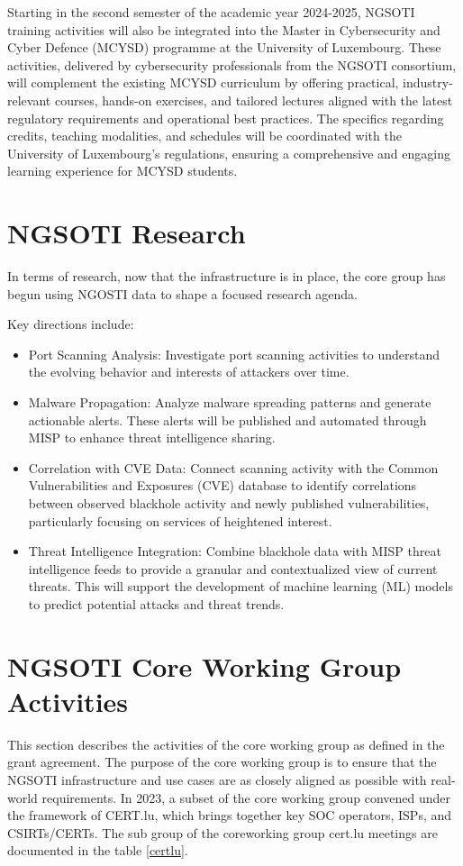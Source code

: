 Starting in the second semester of the academic year 2024-2025, NGSOTI
training activities will also be integrated into the Master in
Cybersecurity and Cyber Defence (MCYSD) programme at the University of
Luxembourg. These activities, delivered by cybersecurity professionals
from the NGSOTI consortium, will complement the existing MCYSD
curriculum by offering practical, industry-relevant courses, hands-on
exercises, and tailored lectures aligned with the latest regulatory
requirements and operational best practices. The specifics regarding
credits, teaching modalities, and schedules will be coordinated with the
University of Luxembourg's regulations, ensuring a comprehensive and
engaging learning experience for MCYSD students.

\section{NGSOTI Research}
In terms of research, now that the infrastructure is in place, the core group
has begun using NGOSTI data to shape a focused research agenda.

Key directions include:

\begin{itemize}
 \item Port Scanning Analysis: Investigate port scanning activities to
 understand the evolving behavior and interests of attackers over time.
 \item Malware Propagation: Analyze malware spreading patterns and
 generate actionable alerts. These alerts will be published and automated
 through MISP to enhance threat intelligence sharing.
 \item Correlation with CVE Data: Connect scanning activity with the
 Common Vulnerabilities and Exposures (CVE) database to identify
 correlations between observed blackhole activity and newly published
 vulnerabilities, particularly focusing on services of heightened interest.
 \item Threat Intelligence Integration: Combine blackhole data with MISP
 threat intelligence feeds to provide a granular and contextualized view
 of current threats. This will support the development of machine
 learning (ML) models to predict potential attacks and threat trends.
 \end{itemize}


\section{NGSOTI Core Working Group Activities}
This section describes the activities of the core working group as defined in the grant agreement. The purpose of the core working group is to ensure that the NGSOTI infrastructure and use cases are as closely aligned as possible with real-world requirements. In 2023, a subset of the core working group convened under the framework of CERT.lu, which brings together key SOC operators, ISPs, and CSIRTs/CERTs.
The sub group of the coreworking group cert.lu meetings are documented in the table \ref{certlu}.

